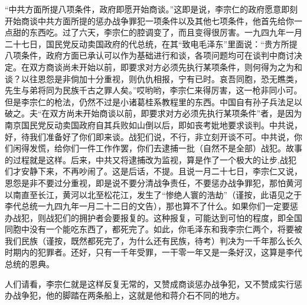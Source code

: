 “中共方面所提八项条件，政府即愿开始商谈。”这即是说，李宗仁的政府愿意即刻开始商谈中共方面所提的惩办战争罪犯一项条件以及其他七项条件，他首先给你一点甜的东西吃。过了六天，李宗仁的腔调变了，而且变得很厉害。一九四九年一月二十七日，国民党反动卖国政府的代总统，在其“致电毛泽东”里面说：“贵方所提八项条件，政府方面已承认可以作为基础进行和谈，各项问题均可在谈判中商讨决定。在双方商谈尚未开始以前，即要求对方必须先执行某项条件，则何得为之为和谈？以往恩怨是非倘加十分重视，则仇仇相报，宁有已时。哀吾同胞，恐无瞧类，先生与弟将同为民族千古之罪人矣。”哎哟哟，李宗仁来得厉害，这一枪非同小可。但是李宗仁的枪法，仍然不过是小诸葛桂系教程里的东西。中国自有孙子兵法足以破之。夫“在双方尚未开始商谈以前，即要求对方必须先执行某项条件”者，是因为南京国民党反动卖国政府自其兵败如山倒以后，即如丧考妣地要求谈判。中共说，好，待我们准备好了你们即来谈。战犯们说，不行，非立刻开谈不可。中共说，你们闲得发慌，给你们一件工作作罢，你们去逮捕一批（自然不是全部）战犯。故事的过程就是这样。后来，中共又将逮捕改为监视，算是作了一个极大的让步,战犯们才安静下来，不再吵闹了。这是后话，不提。且说一月二十七日，李宗仁又说，恩怨是非不要过分重视，即是说不要分清战争责任，不要惩办战争罪犯，那怕黄河以南直至长江，黄河以北至松花江，发生了“惨绝人寰的浩劫”（谨按，此语见之于李代总统一九四九年一月二十二日的文告），那也算不了什么。如果你们一定要惩办战犯，则战犯们的拥护者会要报复的。这种报复，可能达到可怕的程度，即全国同胞中没有一个能吃东西了，都死完了。如此，你毛泽东和我李宗仁两个，将要被我们民族（谨按，既然都死完了，为什么还有民族，待考）判决为一千年那么长久时期内的犯罪者。还好，只有一千年受罪，一干零一年又是一条好汉，这算是李代总统的恩典。

人们请看，李宗仁就是这样反复无常的，又赞成商谈惩办战争犯，又不赞成实行惩办战争犯，他的脚踏在两条船上，这就是他和蒋介石不同的地方。

